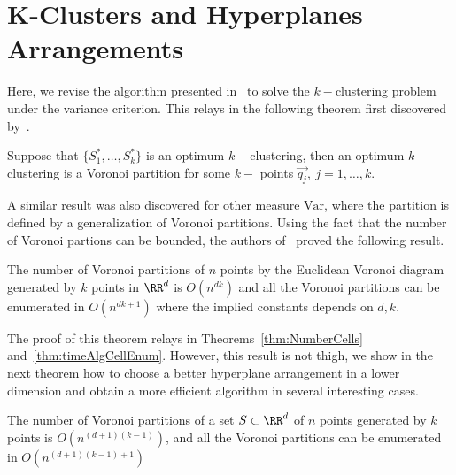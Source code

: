 \section{K-Clusters and Hyperplanes Arrangements}
\label{sec:KClusterHyperplanesArrangements}
Here, we revise the algorithm presented in~\cite{InabaKatohImai} to solve the 
$k-$clustering problem under the variance criterion. This relays in the following 
theorem first discovered by~\cite{MacQueen67}.
\begin{theorem}
  Suppose that $\{S_1^*,\ldots, S_{k}^*\}$ is an optimum
  $k-$clustering, then an optimum $k-$clustering is a Voronoi partition for some
  $k-$ points $\vec{q_j},\ j=1,\ldots,k.$
\end{theorem}
A similar result was also discovered for other measure $\text{Var}$, where the 
partition is defined by a generalization of Voronoi partitions.
Using the fact that the number of Voronoi partions can be bounded, 
the authors of~\cite{InabaKatohImai}  proved the following result.
\begin{theorem}{\cite[Theorem 3]{InabaKatohImai}}
  \label{thm:inaba}
  The number of Voronoi partitions of $n$ points by the Euclidean Voronoi diagram
generated by $k$ points in $\RR^{d}$ is $O(n^{dk})$ and all the Voronoi partitions
can be enumerated in $O(n^{dk+1})$ where the implied constants 
depends on $d,k$.
\end{theorem}
The proof of this theorem relays in Theorems~\ref{thm:NumberCells} 
and~\ref{thm:timeAlgCellEnum}. However, this result is not thigh,
we show in the next theorem how to choose a better hyperplane arrangement
in a lower dimension and obtain a more efficient algorithm in several interesting
cases.
\begin{theorem}
  \label{thm:NumberVoronoiPartitions}
  The number of Voronoi partitions of a set $S\subset\RR^d$ of $n$ points 
  generated by $k$ points is $O(n^{(d+1)(k-1)})$, and all the Voronoi partitions
  can be enumerated in $O(n^{(d+1)(k-1)+1})$
\end{theorem}
